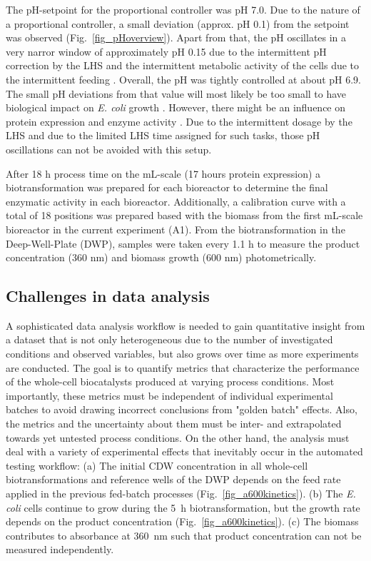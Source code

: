 \documentclass[sn-standardnature]{sn-jnl}%
\theoremstyle{thmstyleone}%
\theoremstyle{thmstyletwo}%
\theoremstyle{thmstylethree}%
\begin{document}
The pH-setpoint for the proportional controller was pH 7.0.
Due to the nature of a proportional controller, a small deviation (approx. pH 0.1) from the setpoint was observed (Fig.~\ref{fig_pHoverview}).
Apart from that, the pH oscillates in a very narror window of approximately pH 0.15 due to the intermittent pH correction by the LHS and the intermittent metabolic activity of the cells due to the intermittent feeding \cite{kim2004high}.
Overall, the pH was tightly controlled at about pH 6.9.
The small pH deviations from that value will most likely be too small to have biological impact on \textit{E. coli} growth \cite{presser1997modelling,gale1942effect}.
However, there might be an influence on protein expression and enzyme activity \cite{cui2009influence,strandberg1991factors}.
Due to the intermittent dosage by the LHS and due to the limited LHS time assigned for such tasks, those pH oscillations can not be avoided with this setup.

After 18 h process time on the mL-scale (17 hours protein expression) a biotransformation was prepared for each bioreactor to determine the final enzymatic activity in each bioreactor.
Additionally, a calibration curve with a total of 18 positions was prepared based with the biomass from the first mL-scale bioreactor in the current experiment (A1).
From the biotransformation in the Deep-Well-Plate (DWP), samples were taken every 1.1 h to measure the product concentration (360 nm) and biomass growth (600 nm) photometrically.

\subsection{Challenges in data analysis}
A sophisticated data analysis workflow is needed to gain quantitative insight from a dataset that is not only heterogeneous due to the number of investigated conditions and observed variables, but also grows over time as more experiments are conducted.
The goal is to quantify metrics that characterize the performance of the whole-cell biocatalysts produced at varying process conditions.
Most importantly, these metrics must be independent of individual experimental batches to avoid drawing incorrect conclusions from "golden batch" effects.
Also, the metrics and the uncertainty about them must be inter- and extrapolated towards yet untested process conditions.
On the other hand, the analysis must deal with a variety of experimental effects that inevitably occur in the automated testing workflow:
(a) The initial CDW concentration in all whole-cell biotransformations and reference wells of the DWP depends on the feed rate applied in the previous fed-batch processes (Fig.~\ref{fig_a600kinetics}).
(b) The \textit{E. coli} cells continue to grow during the 5~h biotransformation, but the growth rate depends on the product concentration (Fig.~\ref{fig_a600kinetics}).
(c) The biomass contributes to absorbance at 360~nm such that product concentration can not be measured independently.
\end{document}
